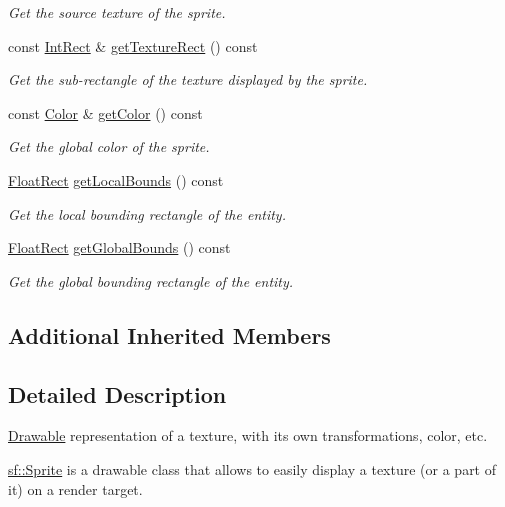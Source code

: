 \begin{DoxyCompactItemize}
\begin{DoxyCompactList}\small\item\em Get the source texture of the sprite. \end{DoxyCompactList}\item 
const \hyperlink{classsf_1_1_rect}{Int\+Rect} \& \hyperlink{classsf_1_1_sprite_a3492896fe7b63f58ae022c5b8bec5c98}{get\+Texture\+Rect} () const
\begin{DoxyCompactList}\small\item\em Get the sub-\/rectangle of the texture displayed by the sprite. \end{DoxyCompactList}\item 
const \hyperlink{classsf_1_1_color}{Color} \& \hyperlink{classsf_1_1_sprite_ac5f419f37b4e38f7a94186e3a3e303e1}{get\+Color} () const
\begin{DoxyCompactList}\small\item\em Get the global color of the sprite. \end{DoxyCompactList}\item 
\hyperlink{classsf_1_1_rect}{Float\+Rect} \hyperlink{classsf_1_1_sprite_ab2f4c781464da6f8a52b1df6058a48b8}{get\+Local\+Bounds} () const
\begin{DoxyCompactList}\small\item\em Get the local bounding rectangle of the entity. \end{DoxyCompactList}\item 
\hyperlink{classsf_1_1_rect}{Float\+Rect} \hyperlink{classsf_1_1_sprite_aa795483096b90745b2e799532963e271}{get\+Global\+Bounds} () const
\begin{DoxyCompactList}\small\item\em Get the global bounding rectangle of the entity. \end{DoxyCompactList}\end{DoxyCompactItemize}
\subsection*{Additional Inherited Members}


\subsection{Detailed Description}
\hyperlink{classsf_1_1_drawable}{Drawable} representation of a texture, with its own transformations, color, etc. 

\hyperlink{classsf_1_1_sprite}{sf\+::\+Sprite} is a drawable class that allows to easily display a texture (or a part of it) on a render target.

